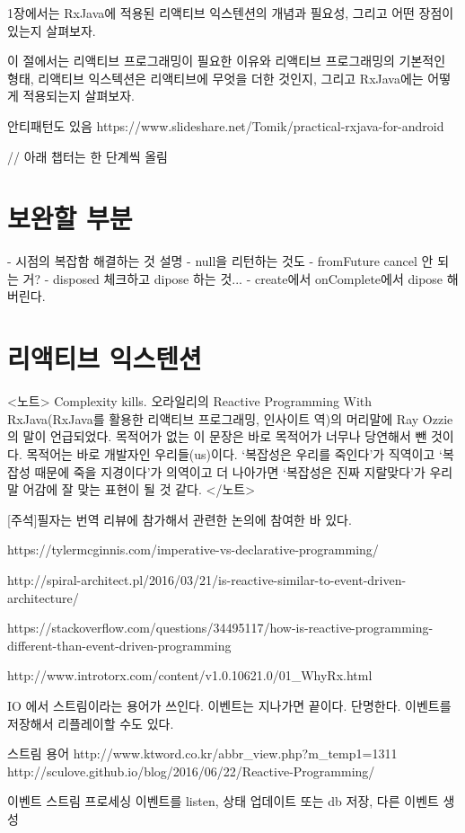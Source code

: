 \documentclass{book}
\begin{document}
1장에서는 RxJava에 적용된 리액티브 익스텐션의 개념과 필요성, 그리고 어떤 장점이 있는지 살펴보자.


이 절에서는 리액티브 프로그래밍이 필요한 이유와 리액티브 프로그래밍의 기본적인 형태, 리액티브 익스텍션은 리액티브에 무엇을 더한 것인지, 그리고 RxJava에는 어떻게 적용되는지 살펴보자.

안티패턴도 있음
https://www.slideshare.net/Tomik/practical-rxjava-for-android

// 아래 챕터는 한 단계씩 올림
\chapter{보완할 부분}
- 시점의 복잡함 해결하는 것 설명
- null을 리턴하는 것도 
- fromFuture cancel 안 되는 거?
- disposed 체크하고 dipose 하는 것...
- create에서 onComplete에서 dipose 해버린다.


\chapter{리액티브 익스텐션}

<노트>
Complexity kills. 오라일리의 Reactive Programming With RxJava(RxJava를 활용한 리액티브 프로그래밍, 인사이트 역)의 머리말에 Ray Ozzie의 말이 언급되었다. 목적어가 없는 이 문장은 바로 목적어가 너무나 당연해서 뺀 것이다. 목적어는 바로 개발자인 우리들(us)이다. ‘복잡성은 우리를 죽인다’가 직역이고 ‘복잡성 때문에 죽을 지경이다’가 의역이고 더 나아가면 ‘복잡성은 진짜 지랄맞다’가 우리말 어감에 잘 맞는 표현이 될 것 같다.
</노트>

[주석]필자는 번역 리뷰에 참가해서 관련한 논의에 참여한 바 있다.


https://tylermcginnis.com/imperative-vs-declarative-programming/

http://spiral-architect.pl/2016/03/21/is-reactive-similar-to-event-driven-architecture/

https://stackoverflow.com/questions/34495117/how-is-reactive-programming-different-than-event-driven-programming

http://www.introtorx.com/content/v1.0.10621.0/01_WhyRx.html

IO 에서 스트림이라는 용어가 쓰인다.
이벤트는 지나가면 끝이다. 단명한다. 이벤트를 저장해서 리플레이할 수도 있다.

스트림 용어
http://www.ktword.co.kr/abbr_view.php?m_temp1=1311
http://sculove.github.io/blog/2016/06/22/Reactive-Programming/

이벤트 스트림 프로세싱
이벤트를 listen, 상태 업데이트 또는 db 저장, 다른 이벤트 생성
\end{document}
